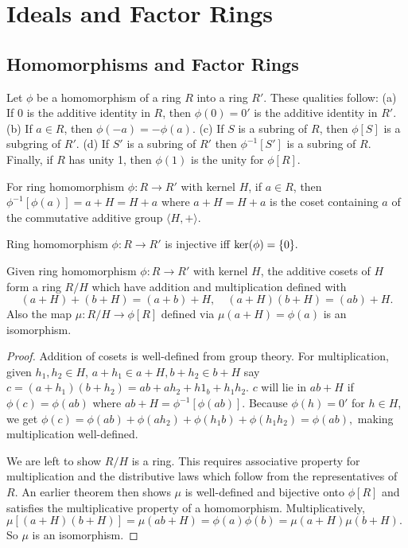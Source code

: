 \chapter{Ideals and Factor Rings}

\section{Homomorphisms and Factor Rings}

\begin{theorem}
    Let $\phi$ be a homomorphism of a ring $R$ into a ring $R'.$ These qualities follow: (a) If 0 is the additive identity in $R$, then $\phi(0) = 0'$ is the additive identity in $R'.$ (b) If $a \in R$, then $\phi(-a) = -\phi(a)$. (c) If $S$ is a subring of $R$, then $\phi[S]$ is a subgring of $R'$. (d) If $S'$ is a subring of $R'$ then $\phi^{-1}[S']$ is a subring of $R$. Finally, if $R$ has unity 1, then $\phi(1)$ is the unity for $\phi[R]$.
\end{theorem}
\begin{theorem}
    For ring homomorphism $\phi\colon R\to R'$ with kernel $H$, if $a \in R$, then $\phi^{-1}[\phi(a)] = a + H = H + a$ where $a + H = H + a$ is the coset containing $a$ of the commutative additive group $\langle H, + \rangle.$
\end{theorem}
\begin{remark}
    Ring homomorphism $\phi\colon R \to R'$ is injective iff $\operatorname{ker}(\phi) = \{0\}.$
\end{remark}
\begin{theorem}
    Given ring homomorphism $\phi\colon R \to R'$ with kernel $H$, the additive cosets of $H$ form a ring $R/H$ which have addition and multiplication defined with $$(a + H) + (b + H) = (a + b) + H, \quad (a + H)(b + H) = (ab) + H.$$ Also the map $\mu\colon R/H \to \phi[R]$ defined via $\mu(a+H) = \phi(a)$ is an isomorphism.
\end{theorem}
\begin{proof}
    Addition of cosets is well-defined from group theory. For multiplication, given $h_1, h_2 \in H$, $a + h_1 \in a + H, b + h_2 \in b + H$ say $c = (a+h_1)(b+h_2) = ab + ah_2 + h1_b + h_1h_2$. $c$ will lie in $ab + H$ if $\phi(c) = \phi(ab)$ where $ab +H = \phi^{-1}[\phi(ab)]$. Because $\phi(h) = 0'$ for $h \in H$, we get $\phi(c) = \phi(ab) + \phi(ah_2) + \phi(h_1b) + \phi(h_1h_2) = \phi(ab),$ making multiplication well-defined.

    We are left to show $R/H$ is a ring. This requires associative property for multiplication and the distributive laws which follow from the representatives of $R$. An earlier theorem then shows $\mu$ is well-defined and bijective onto $\phi[R]$ and satisfies the multiplicative property of a homomorphism. Multiplicatively, $\mu[(a+H)(b+H)] = \mu(ab+H) = \phi(a)\phi(b) = \mu(a+H)\mu(b+H).$ So $\mu$ is an isomorphism.
\end{proof}
